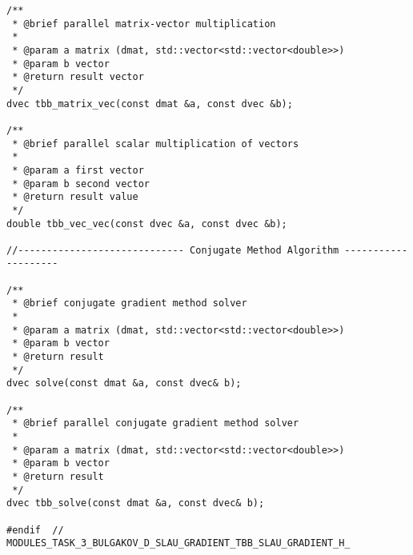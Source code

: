 \documentclass[14pt, russian]{extarticle}
\begin{document}
\begin{lstlisting}
/**
 * @brief parallel matrix-vector multiplication
 * 
 * @param a matrix (dmat, std::vector<std::vector<double>>)
 * @param b vector
 * @return result vector
 */
dvec tbb_matrix_vec(const dmat &a, const dvec &b);

/**
 * @brief parallel scalar multiplication of vectors
 * 
 * @param a first vector
 * @param b second vector
 * @return result value 
 */
double tbb_vec_vec(const dvec &a, const dvec &b);

//----------------------------- Conjugate Method Algorithm --------------------

/**
 * @brief conjugate gradient method solver
 * 
 * @param a matrix (dmat, std::vector<std::vector<double>>)
 * @param b vector
 * @return result 
 */
dvec solve(const dmat &a, const dvec& b);

/**
 * @brief parallel conjugate gradient method solver
 * 
 * @param a matrix (dmat, std::vector<std::vector<double>>)
 * @param b vector
 * @return result 
 */
dvec tbb_solve(const dmat &a, const dvec& b);

#endif  // MODULES_TASK_3_BULGAKOV_D_SLAU_GRADIENT_TBB_SLAU_GRADIENT_H_
        \end{lstlisting}
\end{document}
